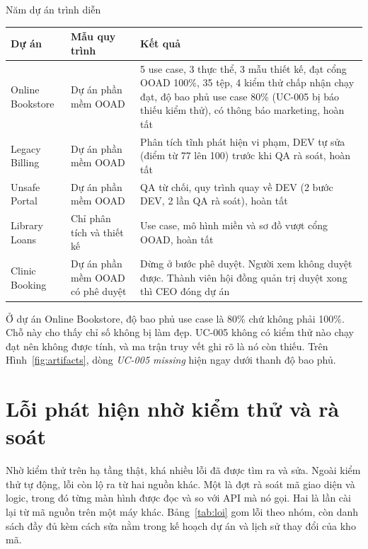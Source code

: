 \begin{table}{Năm dự án trình diễn}
\label{tab:tinh-huong}
\small
\begin{tabularx}{\textwidth}{|P{2.4cm}|P{3.2cm}|L|}
\hline
\textbf{Dự án} & \textbf{Mẫu quy trình} & \textbf{Kết quả} \\ \hline
Online Bookstore & Dự án phần mềm OOAD & 5 use case, 3 thực thể, 3 mẫu thiết kế, đạt cổng OOAD 100\%, 35 tệp, 4 kiểm thử chấp nhận chạy đạt, độ bao phủ use case 80\% (UC-005 bị báo thiếu kiểm thử), có thông báo marketing, hoàn tất \\ \hline
Legacy Billing & Dự án phần mềm OOAD & Phân tích tĩnh phát hiện vi phạm, DEV tự sửa (điểm từ 77 lên 100) trước khi QA rà soát, hoàn tất \\ \hline
Unsafe Portal & Dự án phần mềm OOAD & QA từ chối, quy trình quay về DEV (2 bước DEV, 2 lần QA rà soát), hoàn tất \\ \hline
Library Loans & Chỉ phân tích và thiết kế & Use case, mô hình miền và sơ đồ vượt cổng OOAD, hoàn tất \\ \hline
Clinic Booking & Dự án phần mềm OOAD có phê duyệt & Dừng ở bước phê duyệt. Người xem không duyệt được. Thành viên hội đồng quản trị duyệt xong thì CEO đóng dự án \\ \hline
\end{tabularx}
\end{table}

Ở dự án Online Bookstore, độ bao phủ use case là 80\% chứ không phải 100\%. Chỗ này cho thấy chỉ số không bị làm đẹp. UC-005 không có kiểm thử nào chạy đạt nên không được tính, và ma trận truy vết ghi rõ là nó còn thiếu. Trên Hình~\ref{fig:artifacts}, dòng \textit{UC-005 missing} hiện ngay dưới thanh độ bao phủ.

\section{Lỗi phát hiện nhờ kiểm thử và rà soát}
\label{sec:loi}

Nhờ kiểm thử trên hạ tầng thật, khá nhiều lỗi đã được tìm ra và sửa. Ngoài kiểm thử tự động, lỗi còn lộ ra từ hai nguồn khác. Một là đợt rà soát mã giao diện và logic, trong đó từng màn hình được đọc và so với API mà nó gọi. Hai là lần cài lại từ mã nguồn trên một máy khác. Bảng~\ref{tab:loi} gom lỗi theo nhóm, còn danh sách đầy đủ kèm cách sửa nằm trong kế hoạch dự án và lịch sử thay đổi của kho mã.

